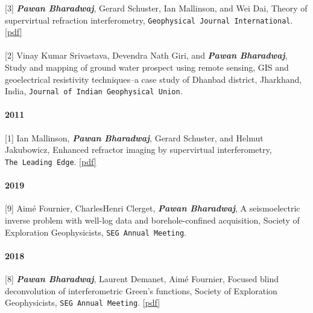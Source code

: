 \documentclass[9pt]{developercv} %
\begin{document}
{[}3{]}
\textbf{\emph{Pawan
Bharadwaj}},
Gerard
Schuster,
Ian
Mallinson,
and Wei
Dai,
Theory of
supervirtual
refraction
interferometry,
\texttt{Geophysical\ Journal\ International}.
\href{https://github.com/pawbz/pawbz.github.io/blob/src/pdf/papers/svi_GJI1.pdf}{{[}pdf{]}}

\paragraph{}\label{section-26}

{[}2{]}
Vinay
Kumar
Srivastava,
Devendra
Nath Giri,
and
\textbf{\emph{Pawan
Bharadwaj}},
Study and
mapping of
ground
water
prospect
using
remote
sensing,
GIS and
geoelectrical
resistivity
techniques--a
case study
of Dhanbad
district,
Jharkhand,
India,
\texttt{Journal\ of\ Indian\ Geophysical\ Union}.

\paragraph{2011}\label{section-27}

{[}1{]}
Ian
Mallinson,
\textbf{\emph{Pawan
Bharadwaj}},
Gerard
Schuster,
and Helmut
Jakubowicz,
Enhanced
refractor
imaging by
supervirtual
interferometry,
\texttt{The\ Leading\ Edge}.
\href{https://github.com/pawbz/pawbz.github.io/blob/src/pdf/papers/svi_TLE.pdf}{{[}pdf{]}}

\label{peer-reviewed-conference-articles-presentations}

\paragraph{2019}\label{section-28}

{[}9{]}
Aimé
Fournier,
Charles­Henri
Clerget,
\textbf{\emph{Pawan
Bharadwaj}},
A
seismoelectric
inverse
problem
with
well-log
data and
borehole-confined
acquisition,
Society of
Exploration
Geophysicists,
\texttt{SEG\ Annual\ Meeting}.

\paragraph{2018}\label{section-29}

{[}8{]}
\textbf{\emph{Pawan
Bharadwaj}},
Laurent
Demanet,
Aimé
Fournier,
Focused
blind
deconvolution
of
interferometric
Green's
functions,
Society of
Exploration
Geophysicists,
\texttt{SEG\ Annual\ Meeting}.
\href{https://github.com/pawbz/pawbz.github.io/blob/src/pdf/abstracts/Pawan_FIBD_SEG.pdf}{{[}pdf{]}}
\end{document}
